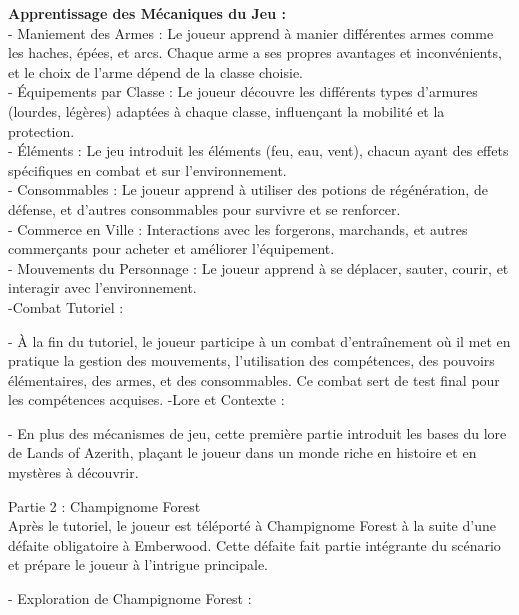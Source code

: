 \textbf{Apprentissage des Mécaniques du Jeu : }
\\

- Maniement des Armes : Le joueur apprend à manier différentes armes comme les haches, épées, et arcs.
Chaque arme a ses propres avantages et inconvénients, et le choix de l'arme dépend de la classe choisie.
\\

- Équipements par Classe : Le joueur découvre les différents types d'armures (lourdes, légères) adaptées à chaque classe, influençant la mobilité et la protection.
\\

- Éléments : Le jeu introduit les éléments (feu, eau, vent), chacun ayant des effets spécifiques en combat et sur l'environnement.
\\

- Consommables : Le joueur apprend à utiliser des potions de régénération, de défense, et d'autres consommables pour survivre et se renforcer.
\\

- Commerce en Ville : Interactions avec les forgerons, marchands, et autres commerçants pour acheter et améliorer l'équipement.
\\

-  Mouvements du Personnage : Le joueur apprend à se déplacer, sauter, courir, et interagir avec l'environnement.
\\

-Combat Tutoriel :

- À la fin du tutoriel, le joueur participe à un combat d'entraînement où il met en pratique la gestion des mouvements, l'utilisation des compétences, des pouvoirs élémentaires, des armes, et des consommables.
Ce combat sert de test final pour les compétences acquises.
-Lore et Contexte :

- En plus des mécanismes de jeu, cette première partie introduit les bases du lore de Lands of Azerith, plaçant le joueur dans un monde riche en histoire et en mystères à découvrir.



Partie 2 : Champignome Forest
\\


Après le tutoriel, le joueur est téléporté à Champignome Forest à la suite d'une défaite obligatoire à Emberwood.
Cette défaite fait partie intégrante du scénario et prépare le joueur à l'intrigue principale.



- Exploration de Champignome Forest :

